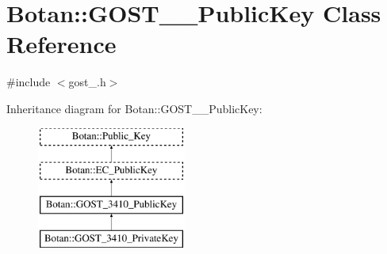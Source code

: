 \hypertarget{classBotan_1_1GOST__3410__PublicKey}{\section{Botan\-:\-:G\-O\-S\-T\-\_\-\_\-\-Public\-Key Class Reference}
\label{classBotan_1_1GOST__3410__PublicKey}
}


{\ttfamily \#include $<$gost\-\_.\-h$>$}

Inheritance diagram for Botan\-:\-:G\-O\-S\-T\-\_\-\_\-\-Public\-Key\-:\begin{figure}[H]
\begin{center}
\leavevmode
\includegraphics[height=4.000000cm]{classBotan_1_1GOST__3410__PublicKey}
\end{center}
\end{figure}

